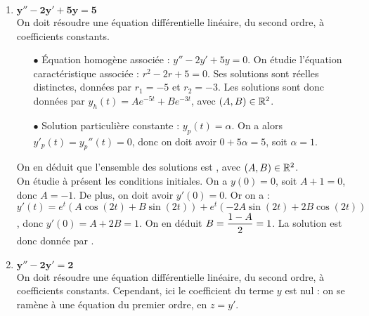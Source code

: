 \documentclass[a4paper, 11pt,reqno]{article}
\begin{document}
\begin{correction}
\begin{enumerate}
\begin{itemize}
\item[$\bullet$] Solution particuli\`ere constante : $y_p(t) = \alpha$. On a alors $y'_p(t) = y_p''(t) = 0$, donc on doit avoir $0 + \alpha = 4$, soit $\alpha = 4$.
\end{itemize}
On en d\'eduit que l'ensemble des solutions est , avec $(A,B) \in \R^2\}$.\\ 
On \'etudie \`a pr\'esent les conditions initiales. On a $y(0) = 0$, soit $A=0$. De plus, on doit avoir $y'(0)=0$. Or on a : $y'(t) = \ddp \frac{A}{2} e^{\frac{t}{2}}  + B e^{\frac{t}{2}} + \frac{B}{2} t e^{\frac{t}{2}}$, donc $y'(0) = \ddp \frac{A+B}{2} = 1$, soit $B=2$. La solution est donc donn\'ee par  .
\item $\mathbf{y''-2y'+5y=5}$\\
On doit r\'esoudre une \'equation diff\'erentielle lin\'eaire, du second ordre, \`a coefficients constants.
\begin{itemize}
\item[$\bullet$] \'Equation homog\`ene associ\'ee : $ y''-2y'+5y= 0$. On \'etudie l'\'equation caract\'eristique associ\'ee : $r^2 -2r+5=0$. Ses solutions sont r\'eelles distinctes, donn\'ees par $r_1=-5$ et $r_2=-3$. Les solutions sont donc donn\'ees par $y_h(t) = A e^{-5t} + B e^{-3t}$, avec $(A,B) \in \mathbb{R}^2$.
\item[$\bullet$] Solution particuli\`ere constante : $y_p(t) = \alpha$. On a alors $y'_p(t) = y_p''(t) = 0$, donc on doit avoir $0 +5 \alpha = 5$, soit $\alpha = 1$.
\end{itemize}
On en d\'eduit que l'ensemble des solutions est , avec $(A,B) \in \mathbb{R}^2$.\\ 
On \'etudie \`a pr\'esent les conditions initiales. On a $y(0) = 0$, soit $A+1=0$, donc $A=-1$. De plus, on doit avoir $y'(0)=0$. Or on a : $y'(t) = e^{t} (A\cos(2t)+ B \sin(2t)) + e^{t} (-2A\sin(2t)+2B \cos(2t))$, donc $y'(0) = A+2B = 1$. On en d\'eduit $B=\displaystyle \frac{1-A}{2} =1$.
La solution est donc donn\'ee par  .
\item $\mathbf{y''-2y'=2}$\\
On doit r\'esoudre une \'equation diff\'erentielle lin\'eaire, du second ordre, \`a coefficients constants. Cependant, ici le coefficient du terme $y$ est nul : on se ram\`ene \`a une \'equation du premier ordre, en $z=y'$.\\

\end{enumerate}
\end{correction}
\end{document}
